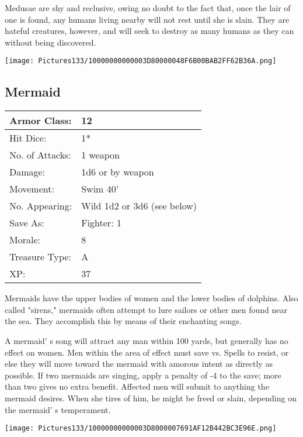 \documentclass[a4paper,twoside,openany,10pt]{book}
\begin{document}
\begin{multicols}{2}
Medusae are shy and reclusive, owing no doubt to the fact that, once the lair of one is found, any humans living nearby will not rest until she is slain. They are hateful creatures, however, and will seek to destroy as many humans as they can without being discovered.

\begin{center} \texttt{[image: Pictures133/10000000000003D80000048F6B00BAB2FF62B36A.png]} \end{center}


\subsection*{Mermaid}\label{mermaid}

\begin{tabularx}{0.50\textwidth}{@{}lX@{}}
Armor Class: & 12 \\\hline
Hit Dice: & 1* \\\hline
No. of Attacks: & 1 weapon \\\hline
Damage: & 1d6 or by weapon \\\hline
Movement: & Swim 40' \\\hline
No. Appearing: & Wild 1d2 or 3d6 (see below) \\\hline
Save As: & Fighter: 1 \\\hline
Morale: & 8 \\\hline
Treasure Type: & A \\\hline
XP: & 37 \\\hline
\end{tabularx}\medskip

Mermaids have the upper bodies of women and the lower bodies of dolphins. Also called "sirens," mermaids often attempt to lure sailors or other men found near the sea. They accomplish this by means of their enchanting songs.

A mermaid' s song will attract any man within 100 yards, but generally has no effect on women. Men within the area of effect must save vs. Spells to resist, or else they will move toward the mermaid with amorous intent as directly as possible. If two mermaids are singing, apply a penalty of -4 to the save; more than two gives no extra benefit. Affected men will submit to anything the mermaid desires. When she tires of him, he might be freed or slain, depending on the mermaid' s temperament.


\begin{center} \texttt{[image: Pictures133/10000000000003D8000007691AF12B442BC3E96E.png]} \end{center}


\end{multicols}
\end{document}
